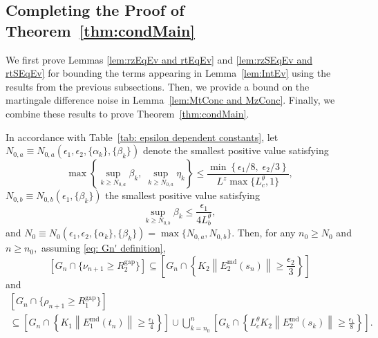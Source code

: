 \documentclass[usenames,dvipsnames,final,12pt]{colt2018} %
\newcommand{\et}{\epsilon_1}
\newcommand{\etg}{R_1^{\textrm{gap}}}
\newcommand{\rt}{\rho}
\newcommand{\Et}{E_1}
\newcommand{\Kt}{K_1}
\newcommand{\EtM}{\Et^{\md}}
\newcommand{\Lt}[1]{L^{\theta}_{#1}}
\newcommand{\ez}{\epsilon_2}
\newcommand{\ezg}{R_2^{\textrm{gap}}}
\newcommand{\rz}{\nu}
\newcommand{\Ez}{E_2}
\newcommand{\Lz}{L^z}
\newcommand{\Kz}{K_2}
\newcommand{\EzM}{\Ez^{\md}}
\newcommand{\N}[1]{N_{0,#1}}
\newcommand{\md}{\text{md}}
\newcommand{\tI}[1]{t_{#1}}
\newcommand{\sI}[1]{s_{#1}}
\newcommand{\norm}[1]{\left\lVert#1\right\rVert}
\newcommand{\gal}[1]{#1}
\begin{document}
\subsection{\gal{Completing the Proof of Theorem~\ref{thm:condMain}}} \label{sec: conc_bound_appendx}
We first prove Lemmas \ref{lem:rzEqEv and rtEqEv} and \ref{lem:rzSEqEv and rtSEqEv} for
{
bounding the terms appearing in Lemma~\ref{lem:IntEv} using the results from the previous subsections.
Then, we provide a bound on the martingale difference noise in Lemma~\ref{lem:MtConc and MzConc}.
Finally, we combine these results to prove Theorem~\ref{thm:condMain}.
}






\begin{lemma}
\label{lem:rzEqEv and rtEqEv}
{
In accordance with Table~\ref{tab: epsilon dependent constants}, let $\N{a} \equiv \N{a}(\et,\ez,\{\alpha_k\},\{\beta_k\})$ denote the smallest positive value satisfying
\begin{equation}
\label{eq: Na def}
\max \left\{\sup_{k \geq \N{a}} \beta_k, \; \sup_{k \geq \N{a}} \eta_k \right\} \leq \frac{\min\left\{ {\et}/{8},\; {\ez}/{3}\right\}}{\Lz \max\{\Lt{c}, 1\}},
\end{equation}
$\N{b} \equiv \N{b}(\et,\{\beta_k\})$ the smallest positive value satisfying
\begin{equation}
\label{eq: Nb def}
\sup_{k \geq \N{b}} \beta_k \leq \frac{\et}{4\Lt{b}},
\end{equation}
and $N_0 \equiv N_0(\et,\ez,\{\alpha_k\},\{\beta_k\}) = \max\{\N{a},\N{b}\}$.
Then, for any $n_0 \geq N_0$ and $n \geq n_0,$}
\gal{assuming \eqref{eq: Gn' definition},}%
\begin{equation}
\label{eq:rzEqEv}
[ G_n \cap \{\rz_{n + 1} \geq \ezg\}] \subseteq \left[ G_n \cap \left\{\Kz \norm{\EzM(\sI{n})} \geq \frac{\ez}{3}\right\}\right]
\end{equation}
{
and
}
%
\begin{multline}
\label{eq:rtEqEv}
[ G_n \cap \{\rt_{n + 1} \geq \etg\}] \\
\subseteq \left[ G_n \cap \left\{ \Kt \norm{\EtM(\tI{n})} \geq \frac{\et}{4}\right\}\right] \cup \bigcup_{k = n_0}^{n} \left[ G_k \cap \left\{ \Lt{c} \Kz \norm{\EzM(\sI{k})} \geq \frac{\et}{8}\right\}\right].
\end{multline}

\end{lemma}
\end{document}
